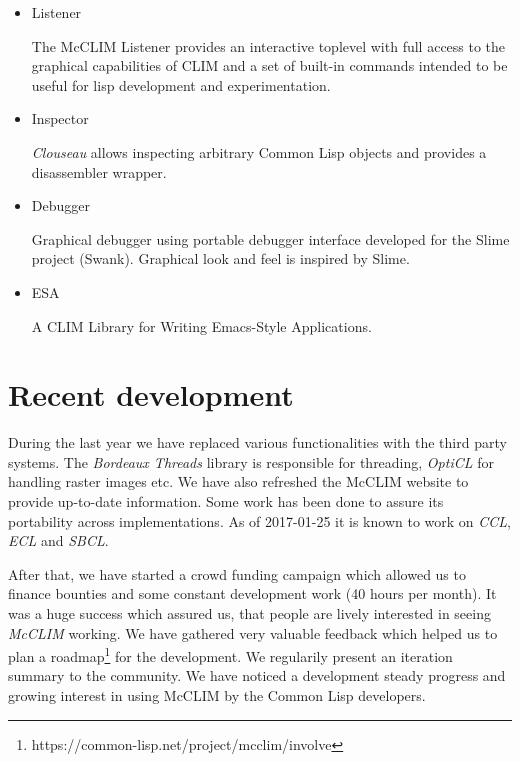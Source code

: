\documentclass{sig-alternate-05-2015}
\begin{document}
\begin{itemize}

\item Listener

  The McCLIM Listener provides an interactive toplevel with full
  access to the graphical capabilities of CLIM and a set of built-in
  commands intended to be useful for lisp development and
  experimentation.

\item Inspector

  \emph{Clouseau} allows inspecting arbitrary Common Lisp objects and
  provides a disassembler wrapper.

\item Debugger

  Graphical debugger using portable debugger interface developed for
  the Slime project (Swank). Graphical look and feel is inspired by
  Slime.

\item ESA\cite{Strandh:2007:ECL:1622123.1622150}

  A CLIM Library for Writing Emacs-Style Applications.

\end{itemize}

\section{Recent development}

During the last year we have replaced various functionalities with the
third party systems. The \emph{Bordeaux Threads} library is
responsible for threading, \emph{OptiCL} for handling raster images
etc. We have also refreshed the McCLIM website to provide up-to-date
information. Some work has been done to assure its portability across
implementations. As of 2017-01-25 it is known to work on \emph{CCL},
\emph{ECL} and \emph{SBCL}.

After that, we have started a crowd funding campaign which allowed us
to finance bounties and some constant development work (40 hours per
month). It was a huge success which assured us, that people are lively
interested in seeing \emph{McCLIM} working. We have gathered very
valuable feedback which helped us to plan a
roadmap\footnote{https://common-lisp.net/project/mcclim/involve} for
the development. We regularily present an iteration summary to the
community. We have noticed a development steady progress and growing
interest in using McCLIM by the Common Lisp developers.
\end{document}
